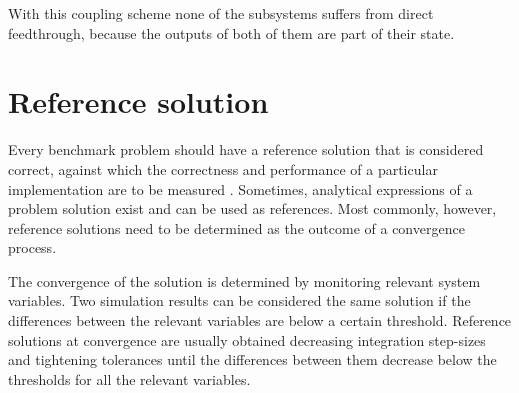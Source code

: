 \documentclass[fleqn,11pt]{article}
\begin{document}
With this coupling scheme none of the subsystems suffers from direct feedthrough, because the outputs of both of them are part of their state.

\newpage
\section{Reference solution}
\label{ReferenceSolution}

Every benchmark problem should have a reference solution that is considered correct, against which the correctness and performance of a particular implementation are to be measured \cite{Gonzalez2009}.
Sometimes, analytical expressions of a problem solution exist and can be used as references.
Most commonly, however, reference solutions need to be determined as the outcome of a convergence process.

The convergence of the solution is determined by monitoring relevant system variables.
Two simulation results can be considered the same solution if the differences between the relevant variables are below a certain threshold.
Reference solutions at convergence are usually obtained decreasing integration step-sizes and tightening  tolerances until the differences between them decrease below the thresholds for all the relevant variables.
\end{document}
